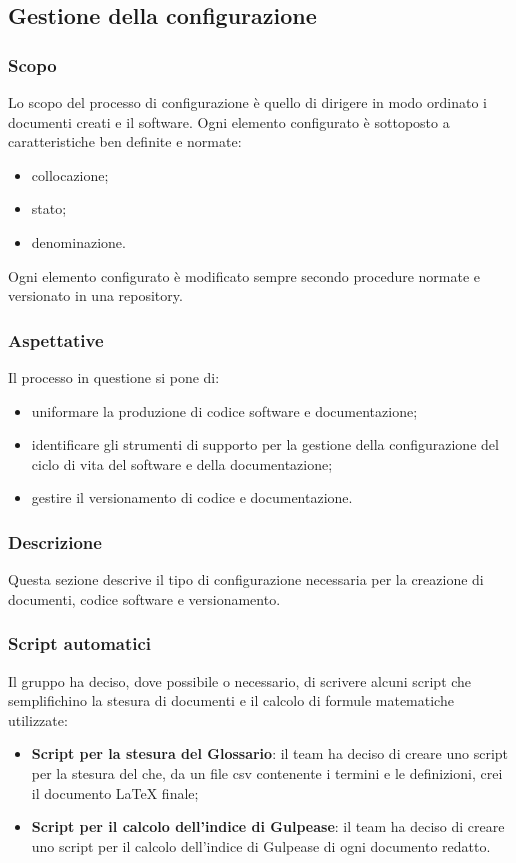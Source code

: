 \subsection{Gestione della configurazione}\label{3.2}

\subsubsection{Scopo}\label{3.2.1}
Lo scopo del processo di configurazione è quello di dirigere in modo ordinato i documenti creati e il software. Ogni elemento configurato è sottoposto a caratteristiche ben definite e normate:
\begin{itemize}
 \item collocazione;
 \item stato;
 \item denominazione.
\end{itemize}
Ogni elemento configurato è modificato sempre secondo procedure normate e versionato in una repository.

\subsubsection{Aspettative}
Il processo in questione si pone di:
\begin{itemize}
\item uniformare la produzione di codice software e documentazione;
\item identificare gli strumenti di supporto per la gestione della configurazione del ciclo di vita del software e della documentazione;
\item gestire il versionamento di codice e documentazione.
\end{itemize}


\subsubsection{Descrizione}
Questa sezione descrive il tipo di configurazione necessaria per la creazione di documenti, codice software e versionamento.



\subsubsection{Script automatici}
Il gruppo ha deciso, dove possibile o necessario, di scrivere alcuni script che semplifichino la stesura di documenti e il calcolo di formule matematiche utilizzate:
\begin{itemize}
	\item \textbf{Script per la stesura del Glossario}: il team ha deciso di creare uno script per la stesura del \Glossariov che, da un file csv contenente i termini e le definizioni, crei il documento \LaTeX{} finale;
	\item \textbf{Script per il calcolo dell'indice di Gulpease}: il team ha deciso di creare uno script per il calcolo dell'indice di Gulpease di ogni documento redatto.
\end{itemize}